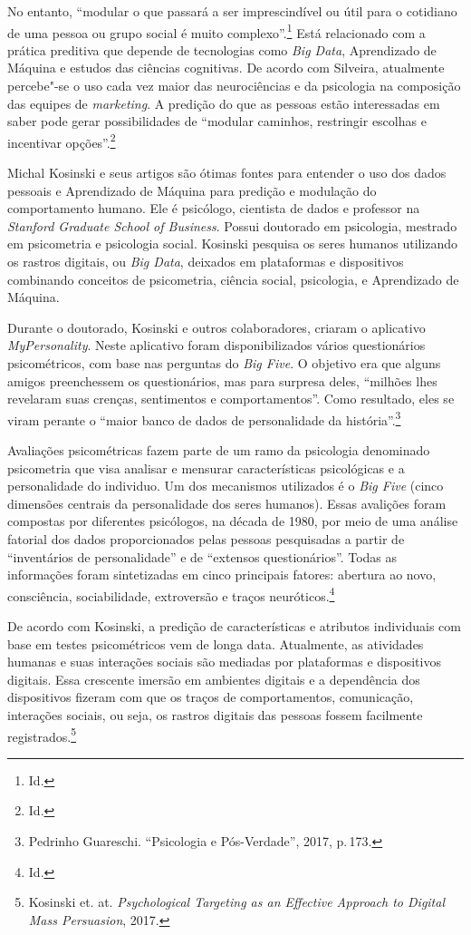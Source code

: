 No entanto, ``modular o que passará a ser imprescindível ou útil para o
cotidiano de uma pessoa ou grupo social é muito complexo''.\footnote{Id.} Está relacionado com a prática preditiva que depende
de tecnologias como \emph{Big Data}, Aprendizado de Máquina e estudos
das ciências cognitivas. De acordo com Silveira, atualmente percebe"-se
o uso cada vez maior das neurociências e da psicologia na composição das
equipes de \emph{marketing}. A predição do que as pessoas estão interessadas em
saber pode gerar possibilidades de ``modular caminhos, restringir
escolhas e incentivar opções''.\footnote{Id.}

Michal Kosinski e seus artigos são ótimas fontes para entender o uso dos
dados pessoais e Aprendizado de Máquina para predição e modulação do
comportamento humano. Ele é psicólogo, cientista de dados e professor na
\emph{Stanford Graduate School of Business}. Possui doutorado em
psicologia, mestrado em psicometria e psicologia social. Kosinski
pesquisa os seres humanos utilizando os rastros digitais, ou \emph{Big
Data}, deixados em plataformas e dispositivos combinando conceitos de
psicometria, ciência social, psicologia, e Aprendizado de Máquina.

Durante o doutorado, Kosinski e outros colaboradores, criaram o
aplicativo \emph{MyPersonality}. Neste aplicativo foram disponibilizados
vários questionários psicométricos, com base nas perguntas do \emph{Big
Five}. O objetivo era que alguns amigos preenchessem os questionários,
mas para surpresa deles, ``milhões lhes revelaram suas crenças,
sentimentos e comportamentos''. Como resultado, eles se viram perante o
``maior banco de dados de personalidade da história''.\footnote{Pedrinho Guareschi. ``Psicologia e Pós-Verdade'', 2017, p.\,173.}

Avaliações psicométricas fazem parte de um ramo da psicologia denominado
psicometria que visa analisar e mensurar características psicológicas e a personalidade do individuo. Um dos
mecanismos utilizados é o \emph{Big Five} (cinco dimensões centrais da
personalidade dos seres humanos). Essas avalições foram compostas por
diferentes psicólogos, na década de 1980, por meio de uma análise
fatorial dos dados proporcionados pelas pessoas pesquisadas a partir de
``inventários de personalidade'' e de ``extensos questionários''. Todas
as informações foram sintetizadas em cinco principais fatores: abertura
ao novo, consciência, sociabilidade, extroversão e traços neuróticos.\footnote{Id.}

De acordo com Kosinski, a predição de características e
atributos individuais com base em testes psicométricos vem de longa
data. Atualmente, as atividades humanas e suas interações sociais são
mediadas por plataformas e dispositivos digitais. Essa crescente imersão
em ambientes digitais e a dependência dos dispositivos fizeram com que
os traços de comportamentos, comunicação, interações sociais, ou seja,
os rastros digitais das pessoas fossem facilmente registrados.\footnote{Kosinski et. at. \emph{Psychological Targeting as an Effective Approach to Digital Mass
Persuasion}, 2017.}

